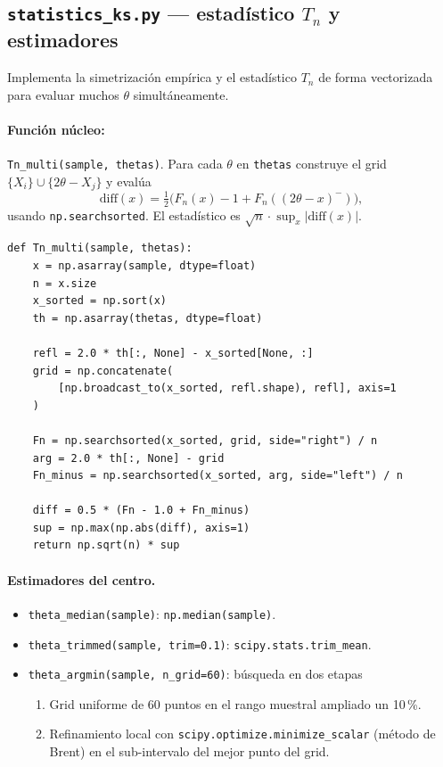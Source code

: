 \documentclass[11pt,a4paper]{article}
\begin{document}
\subsection{\texttt{statistics\_ks.py} --- estadístico \texorpdfstring{$T_n$}{Tn} y estimadores}

Implementa la simetrización empírica y el estadístico $T_n$ de forma vectorizada para evaluar muchos $\theta$ simultáneamente.

\paragraph{Función núcleo:} \texttt{Tn\_multi(sample, thetas)}.
Para cada $\theta$ en \texttt{thetas} construye el grid $\{X_i\}\cup\{2\theta - X_j\}$ y evalúa
\[
  \mathrm{diff}(x) = \tfrac{1}{2}\bigl(F_n(x) - 1 + F_n((2\theta - x)^-)\bigr),
\]
usando \texttt{np.searchsorted}. El estadístico es $\sqrt n\cdot\sup_x|\mathrm{diff}(x)|$.

\begin{lstlisting}[style=pystyle, caption={Vectorización de $T_n$ sobre múltiples $\theta$}]
def Tn_multi(sample, thetas):
    x = np.asarray(sample, dtype=float)
    n = x.size
    x_sorted = np.sort(x)
    th = np.asarray(thetas, dtype=float)

    refl = 2.0 * th[:, None] - x_sorted[None, :]
    grid = np.concatenate(
        [np.broadcast_to(x_sorted, refl.shape), refl], axis=1
    )

    Fn = np.searchsorted(x_sorted, grid, side="right") / n
    arg = 2.0 * th[:, None] - grid
    Fn_minus = np.searchsorted(x_sorted, arg, side="left") / n

    diff = 0.5 * (Fn - 1.0 + Fn_minus)
    sup = np.max(np.abs(diff), axis=1)
    return np.sqrt(n) * sup
\end{lstlisting}

\paragraph{Estimadores del centro.}
\begin{itemize}[leftmargin=*]
    \item \texttt{theta\_median(sample)}: \texttt{np.median(sample)}.
    \item \texttt{theta\_trimmed(sample, trim=0.1)}: \texttt{scipy.stats.trim\_mean}.
    \item \texttt{theta\_argmin(sample, n\_grid=60)}: búsqueda en dos etapas
    \begin{enumerate}
        \item Grid uniforme de 60 puntos en el rango muestral ampliado un 10\,\%.
        \item Refinamiento local con \texttt{scipy.optimize.minimize\_scalar} (método de Brent) en el sub-intervalo del mejor punto del grid.
    \end{enumerate}
\end{itemize}
\end{document}
